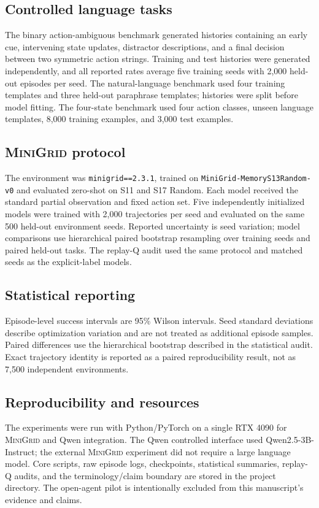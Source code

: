\documentclass[11pt]{article}
\newcommand{\minigrid}{\textsc{MiniGrid}}
\newcommand{\qwen}{Qwen2.5}
\begin{document}
\subsection{Controlled language tasks}
The binary action-ambiguous benchmark generated histories containing an early cue, intervening state updates, distractor descriptions, and a final decision between two symmetric action strings. Training and test histories were generated independently, and all reported rates average five training seeds with 2,000 held-out episodes per seed. The natural-language benchmark used four training templates and three held-out paraphrase templates; histories were split before model fitting. The four-state benchmark used four action classes, unseen language templates, 8,000 training examples, and 3,000 test examples.

\subsection{\minigrid{} protocol}
The environment was \texttt{minigrid==2.3.1}, trained on \texttt{MiniGrid-MemoryS13Random-v0} and evaluated zero-shot on S11 and S17 Random. Each model received the standard partial observation and fixed action set. Five independently initialized models were trained with 2,000 trajectories per seed and evaluated on the same 500 held-out environment seeds. Reported uncertainty is seed variation; model comparisons use hierarchical paired bootstrap resampling over training seeds and paired held-out tasks. The replay-Q audit used the same protocol and matched seeds as the explicit-label models.

\subsection{Statistical reporting}
Episode-level success intervals are 95\% Wilson intervals. Seed standard deviations describe optimization variation and are not treated as additional episode samples. Paired differences use the hierarchical bootstrap described in the statistical audit. Exact trajectory identity is reported as a paired reproducibility result, not as 7,500 independent environments.

\subsection{Reproducibility and resources}
The experiments were run with Python/PyTorch on a single RTX 4090 for \minigrid{} and Qwen integration. The Qwen controlled interface used \qwen-3B-Instruct; the external \minigrid{} experiment did not require a large language model. Core scripts, raw episode logs, checkpoints, statistical summaries, replay-Q audits, and the terminology/claim boundary are stored in the project directory. The open-agent pilot is intentionally excluded from this manuscript's evidence and claims.
\end{document}
